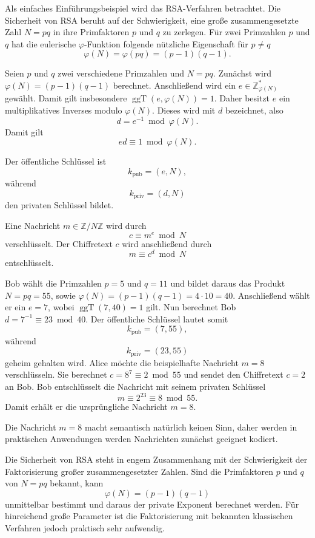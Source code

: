 Als einfaches Einführungsbeispiel wird das RSA-Verfahren betrachtet. Die Sicherheit von RSA beruht auf der Schwierigkeit, eine große zusammengesetzte Zahl $N=pq$ in ihre Primfaktoren $p$ und $q$ zu zerlegen. Für zwei Primzahlen $p$ und $q$ hat die eulerische $\varphi$-Funktion folgende nützliche Eigenschaft für $p\neq q$
\[
    \varphi(N)
    =
    \varphi(pq)
    =
    (p-1)(q-1).
\]
\begin{definition}
    Seien $p$ und $q$ zwei verschiedene Primzahlen und \(N=pq\).
    Zunächst wird \(\varphi(N)=(p-1)(q-1)\) berechnet. Anschließend wird ein \(e\in\mathbb{Z}_{\varphi(N)}^*\) gewählt. Damit gilt insbesondere \(\operatorname{ggT}(e,\varphi(N))=1\). Daher besitzt $e$ ein multiplikatives Inverses modulo $\varphi(N)$. Dieses wird mit $d$ bezeichnet, also
    \[
        d=e^{-1}\bmod{\varphi(N)}.
    \]
    Damit gilt
    \[
        ed\equiv1\bmod{\varphi(N)}.
    \]

    Der öffentliche Schlüssel ist
    \[
        k_{\mathrm{pub}}=(e,N),
    \]
    während
    \[
        k_{\mathrm{priv}}=(d,N)
    \]
    den privaten Schlüssel bildet.

    Eine Nachricht $m\in\mathbb{Z}/N\mathbb{Z}$ wird durch
    \[
        c\equiv m^e\bmod N
    \]
    verschlüsselt. Der Chiffretext $c$ wird anschließend durch
    \[
        m\equiv c^d\bmod N
    \]
    entschlüsselt.
\end{definition}

\begin{beispiel}
    Bob wählt die Primzahlen $p=5$ und $q=11$ und bildet daraus das Produkt $N=pq=55$, sowie \(\varphi(N)=(p-1)(q-1)=4\cdot10=40\). Anschließend wählt er ein $e=7$, wobei $\operatorname{ggT}(7,40)=1$ gilt. Nun berechnet Bob $d=7^{-1}\equiv23 \bmod 40$. Der öffentliche Schlüssel lautet somit
    \[
        k_{\mathrm{pub}}=(7,55),
    \]
    während
    \[
        k_{\mathrm{priv}}=(23,55)
    \]
    geheim gehalten wird. Alice möchte die beispielhafte Nachricht $m=8$ verschlüsseln. Sie berechnet $c=8^{7}\equiv 2 \bmod{55}$ und sendet den Chiffretext $c=2$ an Bob. Bob entschlüsselt die Nachricht mit seinem privaten Schlüssel
    \[
        m\equiv2^{23}\equiv8\bmod{55}.
    \]
    Damit erhält er die ursprüngliche Nachricht $m=8$.
\end{beispiel}
Die Nachricht $m=8$ macht semantisch natürlich keinen Sinn, daher werden in praktischen Anwendungen werden Nachrichten zunächst geeignet kodiert.

Die Sicherheit von RSA steht in engem Zusammenhang mit der Schwierigkeit der Faktorisierung großer zusammengesetzter Zahlen. Sind die Primfaktoren $p$ und $q$ von $N=pq$ bekannt, kann
\[
    \varphi(N)=(p-1)(q-1)
\]
unmittelbar bestimmt und daraus der private Exponent berechnet werden. Für hinreichend große Parameter ist die Faktorisierung mit bekannten klassischen Verfahren jedoch praktisch sehr aufwendig.

